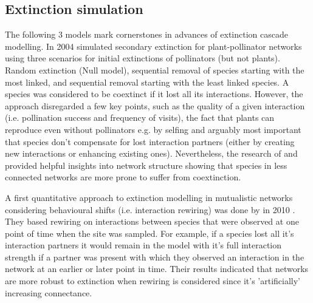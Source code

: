 \documentclass[12pt,a4paper]{article}
\begin{document}

\subsection{Extinction simulation}
The following 3 models mark cornerstones in advances of extinction cascade modelling. In 2004 \citeauthor{Memmott2004} simulated secondary extinction for plant-pollinator networks using three scenarios for initial extinctions of pollinators (but not plants). Random extinction (Null model), sequential removal of species starting with the most linked, and sequential removal starting with the least linked species. A species was considered to be coextinct if it lost all its interactions. However, the approach disregarded a few key points, such as the quality of a given interaction (i.e. pollination success and frequency of visits), the fact that plants can reproduce even without pollinators e.g. by selfing and arguably most important that species don't compensate for lost interaction partners (either by creating new interactions or enhancing existing ones). Nevertheless, the research of \citeauthor{Dunne2002} and \citeauthor{Memmott2004} provided helpful insights into network structure showing that species in less connected networks are more prone to suffer from coextinction. \par

A first quantitative approach to extinction modelling in mutualistic networks considering behavioural shifts (i.e. interaction rewiring) was done by \citeauthor{Kaiser-Bunbury2010} in 2010 \parencite{Kaiser-Bunbury2010}. They based rewiring on interactions between species that were observed at one point of time when the site was sampled. For example, if a species lost all it's interaction partners it would remain in the model with it's full interaction strength if a partner was present with which they observed an interaction in the network at an earlier or later point in time. Their results indicated that networks are more robust to extinction when rewiring is considered since it's 'artificially' increasing connectance. \par
\end{document}
